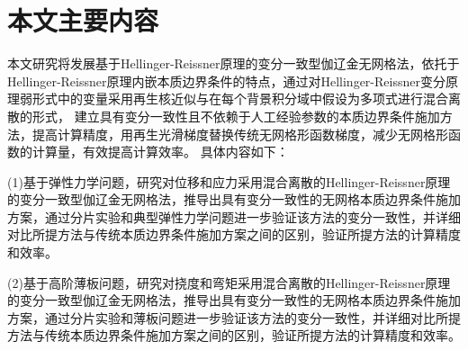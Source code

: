 \section{本文主要内容}
本文研究将发展基于Hellinger-Reissner原理的变分一致型伽辽金无网格法，依托于Hellinger-Reissner原理内嵌本质边界条件的特点，通过对Hellinger-Reissner变分原理弱形式中的变量采用再生核近似与在每个背景积分域中假设为多项式进行混合离散的形式，
建立具有变分一致性且不依赖于人工经验参数的本质边界条件施加方法，提高计算精度，用再生光滑梯度替换传统无网格形函数梯度，减少无网格形函数的计算量，有效提高计算效率。
具体内容如下：\par
(1)基于弹性力学问题，研究对位移和应力采用混合离散的Hellinger-Reissner原理的变分一致型伽辽金无网格法，推导出具有变分一致性的无网格本质边界条件施加方案，通过分片实验和典型弹性力学问题进一步验证该方法的变分一致性，并详细对比所提方法与传统本质边界条件施加方案之间的区别，验证所提方法的计算精度和效率。\par
(2)基于高阶薄板问题，研究对挠度和弯矩采用混合离散的Hellinger-Reissner原理的变分一致型伽辽金无网格法，推导出具有变分一致性的无网格本质边界条件施加方案，通过分片实验和薄板问题进一步验证该方法的变分一致性，并详细对比所提方法与传统本质边界条件施加方案之间的区别，验证所提方法的计算精度和效率。\par




